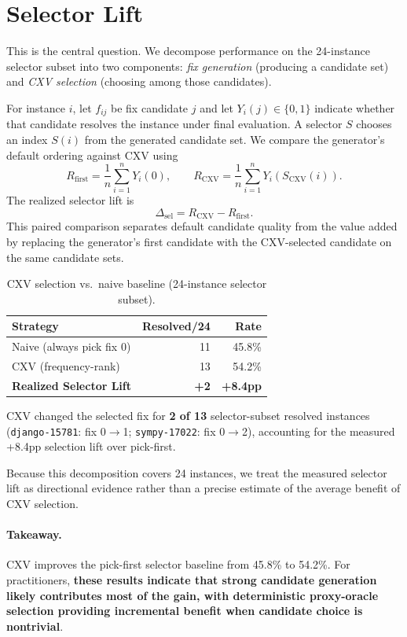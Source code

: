 \documentclass{article}
\begin{document}
\section{Selector Lift}

This is the central question. We decompose performance on the 24-instance selector subset into two components: \emph{fix generation} (producing a candidate set) and \emph{CXV selection} (choosing among those candidates).

For instance $i$, let $f_{ij}$ be fix candidate $j$ and let $Y_i(j)\in\{0,1\}$ indicate whether that candidate resolves the instance under final evaluation. A selector $S$ chooses an index $S(i)$ from the generated candidate set. We compare the generator's default ordering against CXV using
\[
R_{\mathrm{first}}=\frac{1}{n}\sum_{i=1}^{n}Y_i(0),
\qquad
R_{\mathrm{CXV}}=\frac{1}{n}\sum_{i=1}^{n}Y_i(S_{\mathrm{CXV}}(i)).
\]
The realized selector lift is
\[
\Delta_{\mathrm{sel}}=R_{\mathrm{CXV}}-R_{\mathrm{first}}.
\]
This paired comparison separates default candidate quality from the value added by replacing the generator's first candidate with the CXV-selected candidate on the same candidate sets.

\begin{table}
\centering
\caption{CXV selection vs.\ naive baseline (24-instance selector subset).}
\small
\begin{tabular}{lrr}
\toprule
\textbf{Strategy} & \textbf{Resolved/24} & \textbf{Rate} \\
\midrule
Naive (always pick fix 0) & 11 & 45.8\% \\
CXV (frequency-rank) & 13 & 54.2\% \\
\textbf{Realized Selector Lift} & \textbf{+2} & \textbf{+8.4pp} \\
\bottomrule
\end{tabular}
\label{tab:decomposition}
\end{table}

CXV changed the selected fix for \textbf{2 of 13} selector-subset resolved instances (\texttt{django-15781}: fix 0$\rightarrow$1; \texttt{sympy-17022}: fix 0$\rightarrow$2), accounting for the measured +8.4pp selection lift over pick-first.

Because this decomposition covers 24 instances, we treat the measured selector lift as directional evidence rather than a precise estimate of the average benefit of CXV selection.

\paragraph{Takeaway.} CXV improves the pick-first selector baseline from 45.8\% to 54.2\%. For practitioners, \textbf{these results indicate that strong candidate generation likely contributes most of the gain, with deterministic proxy-oracle selection providing incremental benefit when candidate choice is nontrivial}.
\end{document}
